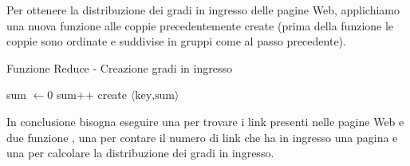Per ottenere la distribuzione dei gradi in ingresso delle pagine Web,
applichiamo una nuova funzione \reduce alle coppie precedentemente create
(prima della funzione le coppie sono ordinate e suddivise in gruppi come al
passo precedente).

\begin{algorithm}
    \caption{Funzione Reduce - Creazione gradi in ingresso}
    \begin{algorithmic}[1]
      	  \State sum \(\gets 0\)
        		\State sum++
        	\EndFor
        	\State create \(\langle\mbox{key,sum}\rangle\)
        \EndFunction
    \end{algorithmic}
\end{algorithm}

In conclusione bisogna eseguire una \map per trovare i link presenti nelle
pagine Web e due funzione \reduce, una per contare il numero di link che ha in
ingresso una pagina e una per calcolare la distribuzione dei gradi in ingresso.
